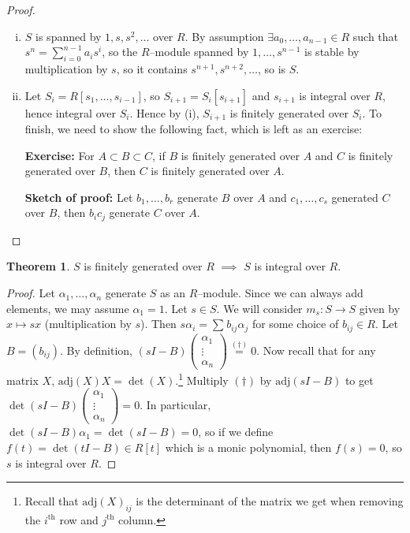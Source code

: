 \documentclass{article}
\theoremstyle{definition}
\newtheorem{theorem}{Theorem}[section]
\begin{document}
\begin{proof}
    \begin{enumerate}[(i)]
        \item $S$ is spanned by $1,s,s^2,\ldots$ over $R$. By assumption $\exists a_0,\ldots,a_{n-1} \in R$ such that $s^n = \sum_{i=0}^{n-1} a_is^i$, so the $R$--module spanned by $1,\ldots,s^{n-1}$ is stable by multiplication by $s$, so it contains $s^{n+1},s^{n+2},\ldots$, so is $S$.
        \item Let $S_i = R[s_1,\ldots,s_{i-1}]$, so $S_{i+1}=S_i[s_{i+1}]$ and $s_{i+1}$ is integral over $R$, hence integral over $S_i$. Hence by (i), $S_{i+1}$ is finitely generated over $S_i$. To finish, we need to show the following fact, which is left as an exercise:
        \vspace{1mm}
        
        \textbf{Exercise:} For $A \subset B \subset C$, if $B$ is finitely generated over $A$ and $C$ is finitely generated over $B$, then $C$ is finitely generated over $A$.
        \vspace{1mm}
        
        \textbf{Sketch of proof:} Let $b_1,\ldots,b_r$ generate $B$ over $A$ and $c_1,\ldots,c_s$ generated $C$ over $B$, then $b_ic_j$ generate $C$ over $A$.
    \end{enumerate}
\end{proof}
\begin{theorem}\label{1.4}
    $S$ is finitely generated over $R$ $\implies$ $S$ is integral over $R$.
\end{theorem}
\begin{proof}
    Let $\alpha_1,\ldots,\alpha_n$ generate $S$ as an $R$--module. Since we can always add elements, we may assume $\alpha_1=1$. Let $s \in S$. We will consider $m_s : S \to S$ given by $x \mapsto sx$ (multiplication by $s$). Then $s \alpha_i = \sum_{}^{} b_{ij}\alpha_j$ for some choice of $b_{ij} \in R$. Let $B=(b_{ij})$. By definition, $(sI-B)\begin{pmatrix} \alpha_1 \\ \vdots \\ \alpha_n \end{pmatrix} \stackrel{(\dagger)}{=}  0$. Now recall that for any matrix $X$, $\text{adj}(X)X = \det(X)$.\footnote{Recall that $\text{adj}(X)_{ij}$ is the determinant of the matrix we get when removing the $i^{\text{th}}$ row and $j^{\text{th}}$ column.} Multiply $(\dagger)$ by $\text{adj}(sI-B)$ to get $\det(sI-B)\begin{pmatrix} \alpha_1 \\ \vdots \\ \alpha_n \end{pmatrix} = 0$. In particular, $\det(sI-B)\alpha_1 = \det(sI-B) = 0$, so if we define $f(t)=\det(tI-B) \in R[t]$ which is a monic polynomial, then $f(s)=0$, so $s$ is integral over $R$.
\end{proof}
\end{document}
